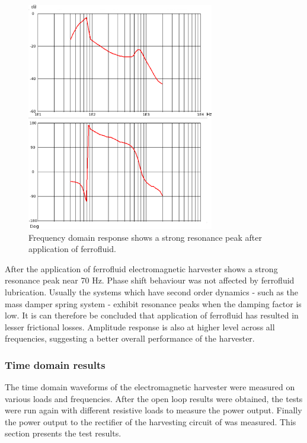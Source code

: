 \begin{figure}[htb]
\begin{center}
\includegraphics[height=10cm]{images/own_measurement/generator_shaker/inductive_bode_ferro.png}
\end{center}
\caption{\label{fig:inductive_bode_ferro} Frequency domain response shows a strong resonance peak after application of ferrofluid.}
\end{figure}

After the application of ferrofluid electromagnetic harvester shows a strong resonance peak near 70 Hz. Phase shift behaviour was not affected by ferrofluid lubrication. Usually the systems which have second order dynamics - such as the mass damper spring system - exhibit resonance peaks when the damping factor is low. It is can therefore be concluded that application of ferrofluid has resulted in lesser frictional losses. Amplitude response is also at higher level across all frequencies, suggesting a better overall performance of the harvester. 

\subsubsection{Time domain results}\label{sect:lg_td}
The time domain waveforms of the electromagnetic harvester were measured on various loads and frequencies. After the open loop results were obtained, the tests were run again with different resistive loads to measure the power output. Finally the power output to the rectifier of the harvesting circuit of was measured. This section presents the test results. 

